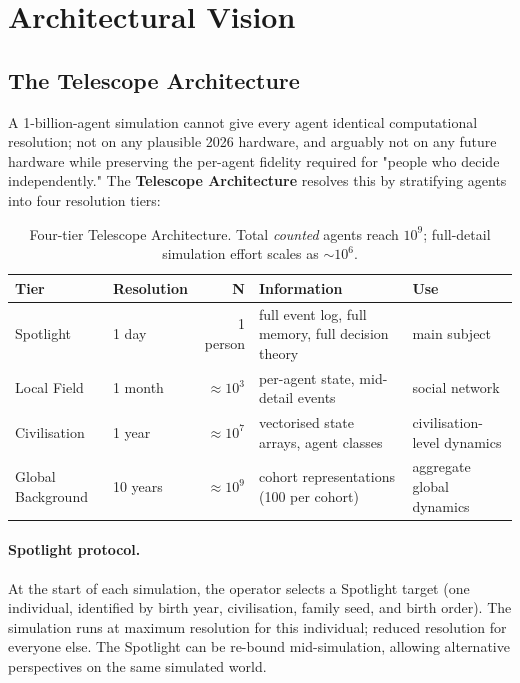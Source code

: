 \section{Architectural Vision}
\label{sec:vision-architecture}

\subsection{The Telescope Architecture}
\label{sec:vision-telescope}

A 1-billion-agent simulation cannot give every agent identical
computational resolution; not on any plausible 2026 hardware, and
arguably not on any future hardware while preserving the per-agent
fidelity required for "people who decide independently." The
\textbf{Telescope Architecture} resolves this by stratifying agents
into four resolution tiers:

\begin{table}[ht]
\centering
\small
\begin{tabularx}{\linewidth}{XlrXl}
\toprule
\textbf{Tier} & \textbf{Resolution} & \textbf{N} & \textbf{Information}
& \textbf{Use} \\
\midrule
Spotlight & 1 day & 1 person & full event log, full memory, full
decision theory & main subject \\
Local Field & 1 month & $\approx 10^3$ & per-agent state, mid-detail
events & social network \\
Civilisation & 1 year & $\approx 10^7$ & vectorised state arrays,
agent classes & civilisation-level dynamics \\
Global Background & 10 years & $\approx 10^9$ & cohort
representations (100 per cohort) & aggregate global dynamics \\
\bottomrule
\end{tabularx}
\caption[Telescope Architecture tiers]{Four-tier Telescope
Architecture. Total \emph{counted} agents reach $10^9$; full-detail
simulation effort scales as $\sim10^6$.}
\label{tab:vision-telescope}
\end{table}

\paragraph{Spotlight protocol.}
At the start of each simulation, the operator selects a Spotlight
target (one individual, identified by birth year, civilisation, family
seed, and birth order). The simulation runs at maximum resolution for
this individual; reduced resolution for everyone else. The Spotlight
can be re-bound mid-simulation, allowing alternative perspectives on
the same simulated world.


